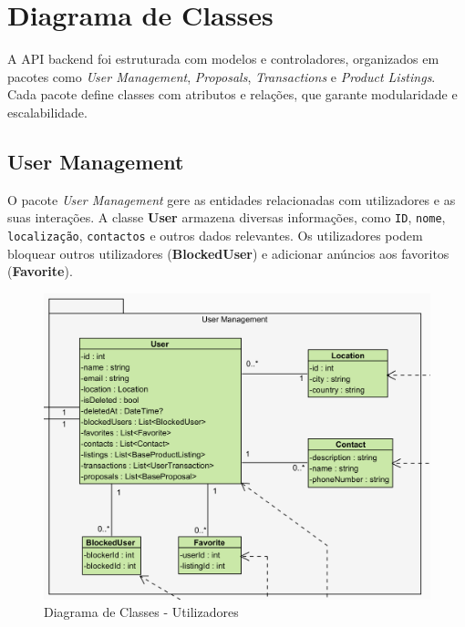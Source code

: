 \documentclass[a4paper, 12pt]{article} %
\begin{document}

\clearpage
\newpage
\section{Diagrama de Classes}

A API backend foi estruturada com modelos e controladores, organizados em pacotes como \textit{User Management}, \textit{Proposals}, \textit{Transactions} e \textit{Product Listings}. Cada pacote define classes com atributos e relações, que garante modularidade e escalabilidade.

\subsection{User Management}
O pacote \textit{User Management} gere as entidades relacionadas com utilizadores e as suas interações. A classe \textbf{User} armazena diversas informações, como \verb*|ID|, \verb*|nome|, \verb*|localização|, \verb*|contactos| e outros dados relevantes. Os utilizadores podem bloquear outros utilizadores (\textbf{BlockedUser}) e adicionar anúncios aos favoritos (\textbf{Favorite}).

\begin{figure}[ht]
	\centering
	\includegraphics[width=\textwidth]{../images/class-diagram-user-management.png}
	\caption{Diagrama de Classes - Utilizadores}
	\label{fig:class_diagram_user_management}
\end{figure}
\end{document}
